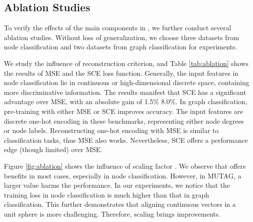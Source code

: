 \subsection{Ablation Studies}
To verify the effects of the main components in \model, we further conduct several ablation studies. Without loss of generalization, we choose three datasets from node classification and two datasets from graph classification for experiments.


We study the influence of reconstruction criterion, and Table \ref{tab:ablation} shows the results of MSE and the SCE loss function.
Generally, the input features in node classification lie in continuous or high-dimensional discrete space, containing more discriminative information.
The results manifest that SCE has a significant advantage over MSE,
with an absolute gain of 1.5\%  8.0\%.
In graph classification, pre-training with either MSE or SCE improves accuracy. 
The input features are discrete one-hot encoding in these benchmarks, 
representing either node degrees or node labels. 
Reconstructing one-hot encoding with MSE is
similar to classification tasks, thus MSE also works. Nevertheless, SCE offers a performance edge (though limited) over MSE. 


Figure \ref{fig:ablation} shows the influence of scaling factor .  We observe that  offers benefits in most cases, especially in node classification. However, in MUTAG, a larger  value harms the performance. In our experiments, we notice that the training loss in node classification is much higher than that in graph classification. 
This further demonstrates that aligning continuous vectors in a unit sphere is more challenging. Therefore, scaling  brings improvements. 





